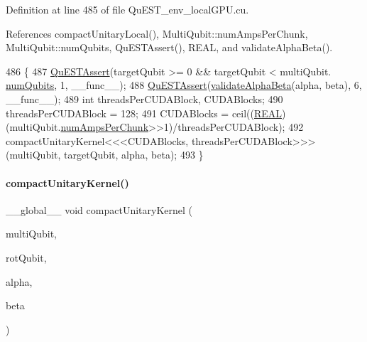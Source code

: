 Definition at line 485 of file Qu\+E\+S\+T\+\_\+env\+\_\+local\+G\+P\+U.\+cu.



References compact\+Unitary\+Local(), Multi\+Qubit\+::num\+Amps\+Per\+Chunk, Multi\+Qubit\+::num\+Qubits, Qu\+E\+S\+T\+Assert(), R\+E\+AL, and validate\+Alpha\+Beta().


\begin{DoxyCode}
486 \{
487     \mbox{\hyperlink{QuEST__env__localGPU_8cu_a3587b9d533e633ccf1abf9ad2ce45d8d}{QuESTAssert}}(targetQubit >= 0 && targetQubit < multiQubit.
      \mbox{\hyperlink{structMultiQubit_ab5b9795bdc6fb5855e1974dcbbaeb36f}{numQubits}}, 1, \_\_func\_\_);
488     \mbox{\hyperlink{QuEST__env__localGPU_8cu_a3587b9d533e633ccf1abf9ad2ce45d8d}{QuESTAssert}}(\mbox{\hyperlink{QuEST_8c_ae2b2c14a07dd7d50ff86032a3ca101d7}{validateAlphaBeta}}(alpha, beta), 6, \_\_func\_\_);
489     \textcolor{keywordtype}{int} threadsPerCUDABlock, CUDABlocks;
490     threadsPerCUDABlock = 128;
491     CUDABlocks = ceil((\mbox{\hyperlink{QuEST__precision_8h_a4b654506f18b8bfd61ad2a29a7e38c25}{REAL}})(multiQubit.\mbox{\hyperlink{structMultiQubit_a1cad83601a78635dd278259c7ed54f18}{numAmpsPerChunk}}>>1)/threadsPerCUDABlock);
492     compactUnitaryKernel<<<CUDABlocks, threadsPerCUDABlock>>>(multiQubit, targetQubit, alpha, beta);
493 \}
\end{DoxyCode}
\mbox{\label{QuEST__env__localGPU_8cu_aec6ec83ed63a7848ddb8f16c88846d25}} 
\paragraph{\texorpdfstring{compact\+Unitary\+Kernel()}{compactUnitaryKernel()}}
{\footnotesize\ttfamily \+\_\+\+\_\+global\+\_\+\+\_\+ void compact\+Unitary\+Kernel (\begin{DoxyParamCaption}\item[{\mbox{\hyperlink{structMultiQubit}{Multi\+Qubit}}}]{multi\+Qubit,  }\item[{const int}]{rot\+Qubit,  }\item[{\mbox{\hyperlink{structComplex}{Complex}}}]{alpha,  }\item[{\mbox{\hyperlink{structComplex}{Complex}}}]{beta }\end{DoxyParamCaption})}

